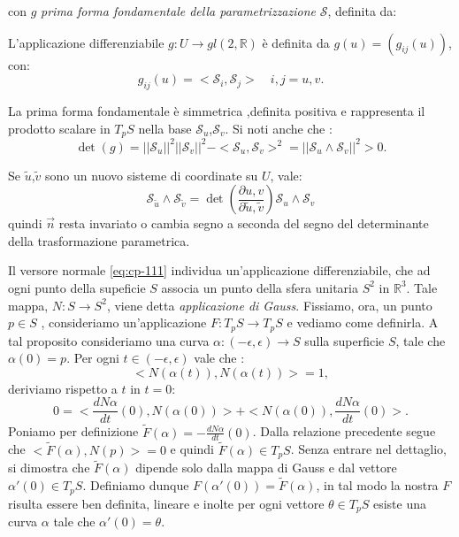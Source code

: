 con $g$ \emph{prima forma fondamentale della parametrizzazione} $\mathcal{S}$, definita da:
\begin{definizione}
L'applicazione differenziabile $g:U\longrightarrow gl(2,\mathbb{R})$ è definita da $g(u)=(g_{ij}(u))$, con:
\begin{equation}
\label{eq:cp-112}
g_{ij}(u) = <\mathcal{S}_i,\mathcal{S}_j>\quad i,j=u,v.
\end{equation}
\end{definizione}
\begin{osservazione}
La prima forma fondamentale è simmetrica ,definita positiva e rappresenta il prodotto scalare in $T_pS$ nella base $\mathcal{S}_u$,$\mathcal{S}_v$. 
Si noti anche che :
\[
\det(g) = ||\mathcal{S}_u||^2||\mathcal{S}_v||^2-<\mathcal{S}_u,\mathcal{S}_v>^2 = ||\mathcal{S}_u\wedge\mathcal{S}_v||^2> 0.
\]
\end{osservazione}

\begin{osservazione}
Se $\tilde{u}$,$\tilde{v}$ sono un nuovo sisteme di coordinate su $U$, vale:
\[
\mathcal{S}_{\tilde{u}}\wedge\mathcal{S}_{\tilde{v}}=\det(\frac{\partial u,v}{\partial \tilde{u},\tilde{v}})\mathcal{S}_u\wedge\mathcal{S}_v
\]
quindi $\vec{n}$ resta invariato o cambia segno a seconda del segno del determinante della trasformazione parametrica.
\end{osservazione}
Il versore normale \eqref{eq:cp-111} individua un'applicazione differenziabile, che ad ogni punto della supeficie $S$ associa un punto della sfera unitaria $S^2$ in $\mathbb{R}^3$. Tale mappa, $N: S\longrightarrow S^2$, viene detta \emph{applicazione di Gauss}. Fissiamo, ora, un punto $p\in S$ , consideriamo un'applicazione  $F: T_pS\longrightarrow T_pS$ e vediamo come definirla. A tal proposito consideriamo una curva  $\alpha : (-\epsilon,\epsilon)\longrightarrow S$ sulla superficie $S$, tale che $\alpha(0)=p$. Per ogni $t\in (-\epsilon,\epsilon)$ vale che :
\[
<N(\alpha(t)),N(\alpha(t))> = 1,
\] 
deriviamo rispetto a $t$ in $t=0$:
\[
0 = <\frac{dN\alpha}{dt}(0),N(\alpha(0))>+<N(\alpha(0)),\frac{dN\alpha}{dt}(0)>.
\]
Poniamo per definizione $\tilde{F}(\alpha) = -\frac{dN\alpha}{dt}(0)$. Dalla relazione precedente segue che $<\tilde{F}(\alpha),N(p)> = 0$ e quindi $\tilde{F}(\alpha)\in T_pS$. Senza entrare nel dettaglio, si dimostra che $\tilde{F}(\alpha)$ dipende solo dalla mappa di Gauss e dal vettore $\alpha'(0)\in T_pS$. Definiamo dunque $F(\alpha'(0))=\tilde{F}(\alpha)$, in tal modo la nostra $F$ risulta essere ben definita, lineare e inolte per ogni vettore $\theta\in T_pS$ esiste una curva $\alpha$ tale che $\alpha'(0)=\theta$.

